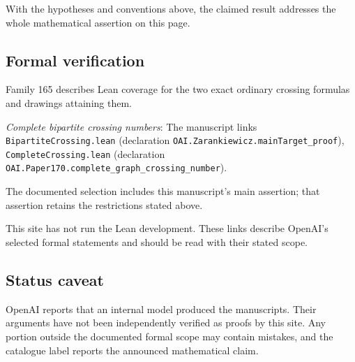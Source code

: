 \documentclass[11pt]{article}
\begin{document}
With the hypotheses and conventions above, the claimed result addresses the whole mathematical assertion on this page.

\subsection{Formal verification}
Family 165 describes Lean coverage for the two exact ordinary crossing formulas and drawings attaining them.

\textit{Complete bipartite crossing numbers}: The manuscript links \texttt{BipartiteCrossing.lean} (declaration \texttt{OAI.Zarankiewicz.mainTarget\_proof}), \texttt{CompleteCrossing.lean} (declaration \texttt{OAI.Paper170.complete\_graph\_crossing\_number}).

The documented selection includes this manuscript’s main assertion; that assertion retains the restrictions stated above.

This site has not run the Lean development. These links describe OpenAI’s selected formal statements and should be read with their stated scope.

\subsection{Status caveat}
OpenAI reports that an internal model produced the manuscripts. Their arguments have not been independently verified as proofs by this site. Any portion outside the documented formal scope may contain mistakes, and the catalogue label reports the announced mathematical claim.
\end{document}
